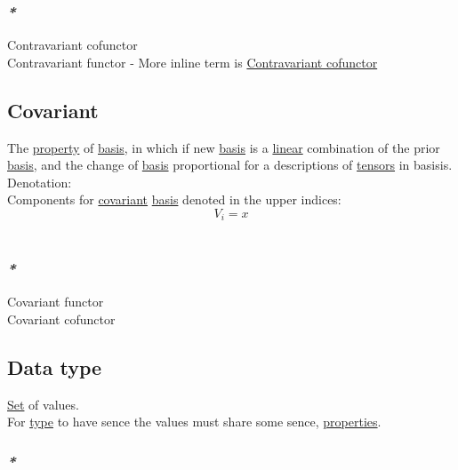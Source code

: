 \documentclass[11pt]{article}
\begin{document}
\subsubsection{\emph{*}}
\label{sec:orge8ad4bd}

\label{org1f72a92}Contravariant cofunctor\\
\label{org4f18281}Contravariant functor - More inline term is \hyperref[org1f72a92]{Contravariant cofunctor}\\

\subsection{\label{orgf529c7b}Covariant}
\label{sec:org49384a7}
The \hyperref[org07ca26b]{property} of \hyperref[org5650c52]{basis}, in which if new \hyperref[org5650c52]{basis} is a \hyperref[orgb55e183]{linear} combination of the prior \hyperref[org5650c52]{basis}, and the change of \hyperref[org5650c52]{basis} proportional for a descriptions of \hyperref[org1fdd1da]{tensors} in basisis.\\

Denotation:\\
Components for \hyperref[orgf529c7b]{covariant} \hyperref[org5650c52]{basis} denoted in the upper indices:\\
$$ V_{i} = x $$\\

\subsubsection{\emph{*}}
\label{sec:org7427908}

\label{orgdf09291}Covariant functor\\
\label{orgd4612fe}Covariant cofunctor\\

\subsection{\label{org965cde3}Data type}
\label{sec:org8bd3a2f}
\hyperref[orgbed80ba]{Set} of values.\\
For \hyperref[org4fbaeb8]{type} to have sence the values must share some sence, \hyperref[org763ad6b]{properties}.\\

\subsubsection{\emph{*}}
\label{sec:orgc8b9503}
\end{document}
